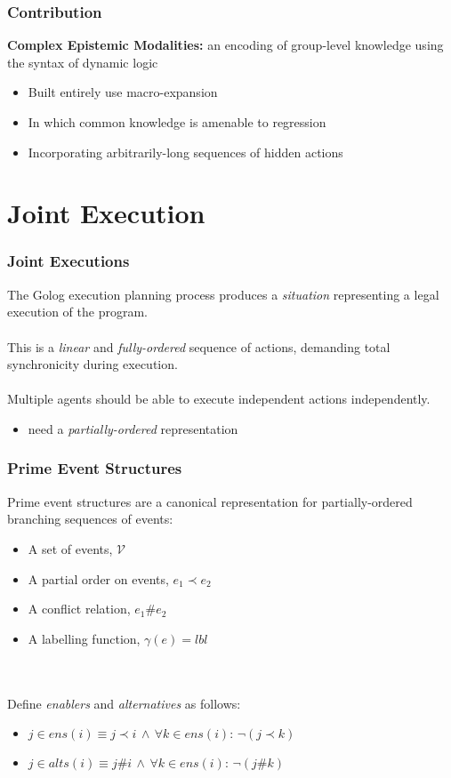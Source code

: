 \documentclass{beamer}
\begin{document}
\begin{frame}
\frametitle{Contribution}
\textbf{Complex Epistemic Modalities:}  an encoding of group-level knowledge using the syntax of dynamic logic
\begin{itemize}
\item Built entirely use macro-expansion
\item In which common knowledge is amenable to regression
\item Incorporating arbitrarily-long sequences of hidden actions
\end{itemize}
\end{frame}

\section{Joint Execution}

\begin{frame}
\frametitle{Joint Executions}
The Golog execution planning process produces a \emph{situation} representing
a legal execution of the program.
\ \\
\ \\
This is a \emph{linear} and \emph{fully-ordered} sequence of actions, 
demanding total synchronicity during execution.
\ \\
\ \\
Multiple agents should be able to execute independent actions independently.
\begin{itemize}
\item need a \emph{partially-ordered} representation
\end{itemize}
\end{frame}

\begin{frame}
\frametitle{Prime Event Structures}
Prime event structures are a canonical representation for partially-ordered
branching sequences of events:
\begin{itemize}
\item A set of events, $\mathcal{V}$
\item A partial order on events, $e_1 \prec e_2$
\item A conflict relation, $e_1 \# e_2$
\item A labelling function, $\gamma(e) = lbl$
\end{itemize}
\ \\
\ \\
Define \emph{enablers} and \emph{alternatives} as follows:
\begin{itemize}
\item $j\in ens(i)\equiv j\prec i\,\wedge\,\forall k\in ens(i):\,\neg(j\prec k)$
\item $j\in alts(i)\equiv j \# i\,\wedge\,\forall k\in ens(i):\,\neg(j \# k)$
\end{itemize}
\end{frame}
\end{document}
